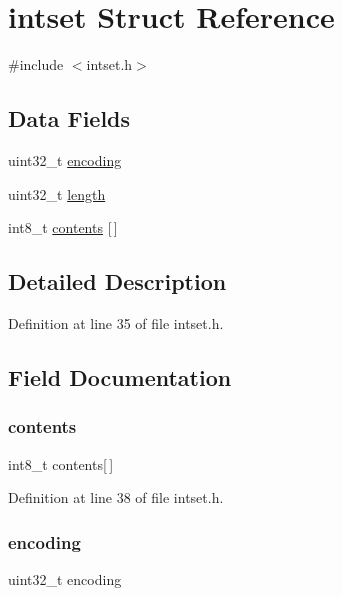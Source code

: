 \hypertarget{structintset}{}\section{intset Struct Reference}
\label{structintset}


{\ttfamily \#include $<$intset.\+h$>$}

\subsection*{Data Fields}
\begin{DoxyCompactItemize}
\item 
uint32\+\_\+t \hyperlink{structintset_abf20f154dd41a6f1b64b0cbfbfb05052}{encoding}
\item 
uint32\+\_\+t \hyperlink{structintset_aebb70c2aab3407a9f05334c47131a43b}{length}
\item 
int8\+\_\+t \hyperlink{structintset_a2849bfd03c0c7b34aaad423672b75045}{contents} \mbox{[}$\,$\mbox{]}
\end{DoxyCompactItemize}


\subsection{Detailed Description}


Definition at line 35 of file intset.\+h.



\subsection{Field Documentation}
\mbox{\label{structintset_a2849bfd03c0c7b34aaad423672b75045}} 
\subsubsection{\texorpdfstring{contents}{contents}}
{\footnotesize\ttfamily int8\+\_\+t contents\mbox{[}$\,$\mbox{]}}



Definition at line 38 of file intset.\+h.

\mbox{\label{structintset_abf20f154dd41a6f1b64b0cbfbfb05052}} 
\subsubsection{\texorpdfstring{encoding}{encoding}}
{\footnotesize\ttfamily uint32\+\_\+t encoding}



